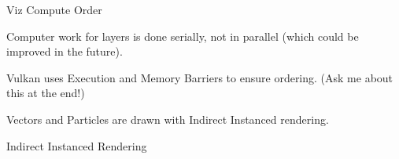 \begin{frame}{Viz Compute Order}
    \vfill\null
    
    \begin{wideitemize}
        \item Computer work for layers is done serially, not in parallel (which could be improved in the future).
        \item Vulkan uses Execution and Memory Barriers to ensure ordering. (Ask me about this at the end!)
        \item Vectors and Particles are drawn with Indirect Instanced rendering.
    \end{wideitemize}
\end{frame}

\begin{frame}{Indirect Instanced Rendering}

        
        

            

\end{frame}
